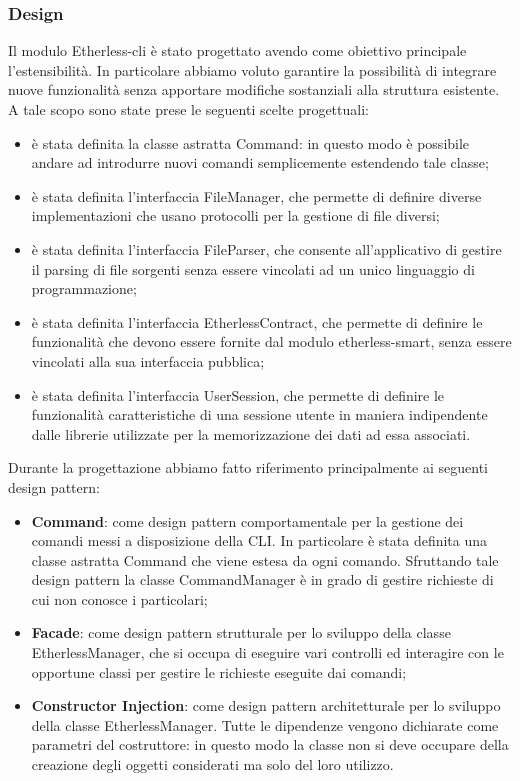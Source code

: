 \subsubsection{Design}
Il modulo Etherless-cli è stato progettato avendo come obiettivo principale l'estensibilità. In particolare abbiamo voluto garantire la possibilità di integrare nuove funzionalità senza apportare modifiche sostanziali alla struttura esistente. A tale scopo sono state prese le seguenti scelte progettuali:
\begin{itemize}
	\item è stata definita la classe astratta Command: in questo modo è possibile andare ad introdurre nuovi comandi semplicemente estendendo tale classe;
	\item è stata definita l'interfaccia FileManager, che permette di definire diverse implementazioni che usano protocolli per la gestione di file diversi;
	\item è stata definita l'interfaccia FileParser, che consente all'applicativo di gestire il parsing di file sorgenti senza essere vincolati ad un unico linguaggio di programmazione;
	\item è stata definita l'interfaccia EtherlessContract, che permette di definire le funzionalità che devono essere fornite dal modulo etherless-smart, senza essere vincolati alla sua interfaccia pubblica;
	\item è stata definita l'interfaccia UserSession, che permette di definire le funzionalità caratteristiche di una sessione utente in maniera indipendente dalle librerie utilizzate per la memorizzazione dei dati ad essa associati.
\end{itemize}

Durante la progettazione abbiamo fatto riferimento principalmente ai seguenti design pattern:
\begin{itemize}
	\item \textbf{Command}: come design pattern comportamentale per la gestione dei comandi messi a disposizione della CLI. In particolare è stata definita una classe astratta Command che viene estesa da ogni comando. Sfruttando tale design pattern la classe CommandManager è in grado di gestire richieste di cui non conosce i particolari;

	\item \textbf{Facade}: come design pattern strutturale per lo sviluppo della classe EtherlessManager, che si occupa di eseguire vari controlli ed interagire con le opportune classi per gestire le richieste eseguite dai comandi;

	\item \textbf{Constructor Injection}: come design pattern architetturale per lo sviluppo della classe EtherlessManager. Tutte le dipendenze vengono dichiarate come parametri del costruttore: in questo modo la classe non si deve occupare della creazione degli oggetti considerati ma solo del loro utilizzo.
\end{itemize}


